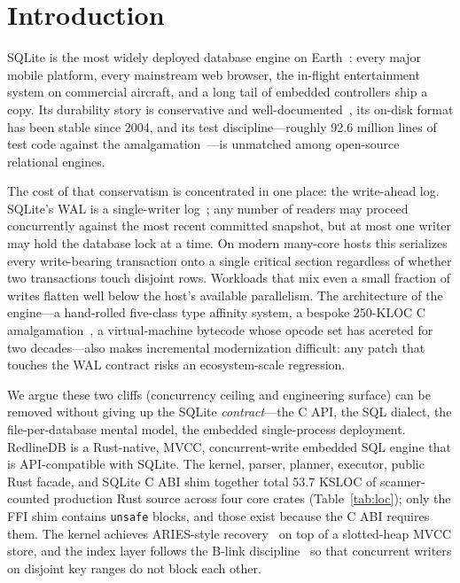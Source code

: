 \section{Introduction}\label{sec:intro}

SQLite is the most widely deployed database engine on
Earth~\cite{sqlite_mostdeployed}: every major mobile platform, every
mainstream web browser, the in-flight entertainment system on commercial
aircraft, and a long tail of embedded controllers ship a copy. Its
durability story is conservative and well-documented~\cite{sqlite_arch},
its on-disk format has been stable since 2004, and its test
discipline---roughly 92.6 million lines of test code against the
amalgamation~\cite{sqlite_testing}---is unmatched among open-source
relational engines.

The cost of that conservatism is concentrated in one place: the
write-ahead log. SQLite's WAL is a single-writer
log~\cite{sqlite_wal}; any number of readers may proceed concurrently
against the most recent committed snapshot, but at most one writer may
hold the database lock at a time. On modern many-core hosts this
serializes every write-bearing transaction onto a single critical
section regardless of whether two transactions touch disjoint rows.
Workloads that mix even a small fraction of writes flatten well below
the host's available parallelism. The architecture of the engine---a
hand-rolled five-class type affinity system, a bespoke 250-KLOC C
amalgamation~\cite{sqlite_footprint}, a virtual-machine bytecode whose
opcode set has accreted for two decades---also makes incremental
modernization difficult: any patch that touches the WAL contract risks
an ecosystem-scale regression.

We argue these two cliffs (concurrency ceiling and engineering surface)
can be removed without giving up the SQLite \emph{contract}---the C
API, the SQL dialect, the file-per-database mental model, the embedded
single-process deployment. RedlineDB is a Rust-native, MVCC,
concurrent-write embedded SQL engine that is API-compatible with
SQLite. %
The kernel, parser, planner, executor, public Rust facade, and
SQLite C ABI shim together total 53.7 KSLOC of scanner-counted
production Rust source across four core crates (Table~\ref{tab:loc});
only the FFI shim contains \texttt{unsafe} blocks, and those exist
because the C ABI requires them.
The kernel achieves ARIES-style recovery~\cite{mohan1992aries} on
top of a slotted-heap MVCC store, and the index layer follows the
B-link discipline~\cite{lehman1981blink,srinivasan1991bplus} so that
concurrent writers on disjoint key ranges do not block each other.

